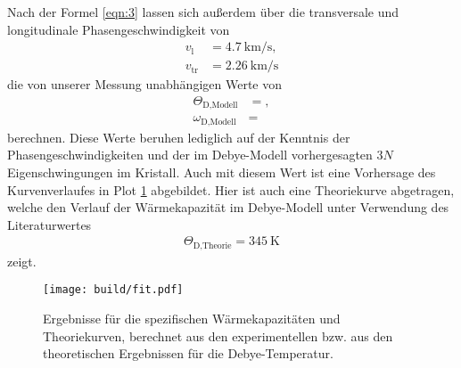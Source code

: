 Nach der Formel \eqref{eqn:3} lassen sich außerdem über die transversale und longitudinale Phasengeschwindigkeit \cite{skript} von
\begin{align*}
  v_{\text{l}}  &= \SI{4.7}{\kilo\meter\per\second},\\
  v_{\text{tr}} &= \SI{2.26}{\kilo\meter\per\second}
\end{align*}
die von unserer Messung unabhängigen Werte von
\begin{align*}
  \Theta_{\text{D,Modell}} &= ,\\
  \omega_{\text{D,Modell}} &= 
\end{align*}
berechnen.
Diese Werte beruhen lediglich auf der Kenntnis der Phasengeschwindigkeiten und der im Debye-Modell vorhergesagten $3N$ Eigenschwingungen im Kristall.
Auch mit diesem Wert ist eine Vorhersage des Kurvenverlaufes in Plot \ref{plot:1} abgebildet.
Hier ist auch eine Theoriekurve abgetragen, welche den Verlauf der Wärmekapazität im Debye-Modell unter Verwendung des Literaturwertes \cite{fuck}
\begin{align*}
  \Theta_{\text{D,Theorie}} = \SI{345}{\kelvin}
\end{align*}
zeigt.

\begin{figure}
  \centering
  \texttt{[image: build/fit.pdf]}
  \caption{Ergebnisse für die spezifischen Wärmekapazitäten und Theoriekurven, berechnet aus den experimentellen bzw. aus den theoretischen Ergebnissen für die Debye-Temperatur.}
  \label{plot:1}
\end{figure}
